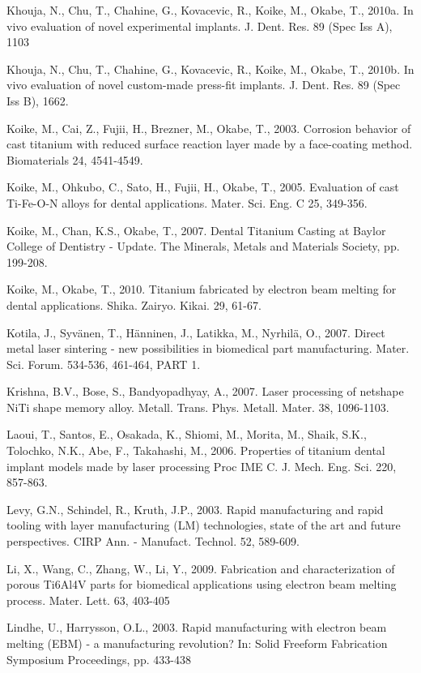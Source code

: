 \documentclass[10pt]{article}
\begin{document}
Khouja, N., Chu, T., Chahine, G., Kovacevic, R., Koike, M., Okabe, T., 2010a. In vivo evaluation of novel experimental implants. J. Dent. Res. 89 (Spec Iss A), 1103

Khouja, N., Chu, T., Chahine, G., Kovacevic, R., Koike, M., Okabe, T., 2010b. In vivo evaluation of novel custom-made press-fit implants. J. Dent. Res. 89 (Spec Iss B), 1662.

Koike, M., Cai, Z., Fujii, H., Brezner, M., Okabe, T., 2003. Corrosion behavior of cast titanium with reduced surface reaction layer made by a face-coating method. Biomaterials 24, 4541-4549.

Koike, M., Ohkubo, C., Sato, H., Fujii, H., Okabe, T., 2005. Evaluation of cast Ti-Fe-O-N alloys for dental applications. Mater. Sci. Eng. C 25, 349-356.

Koike, M., Chan, K.S., Okabe, T., 2007. Dental Titanium Casting at Baylor College of Dentistry - Update. The Minerals, Metals and Materials Society, pp. 199-208.

Koike, M., Okabe, T., 2010. Titanium fabricated by electron beam melting for dental applications. Shika. Zairyo. Kikai. 29, 61-67.

Kotila, J., Syvänen, T., Hänninen, J., Latikka, M., Nyrhilä, O., 2007. Direct metal laser sintering - new possibilities in biomedical part manufacturing. Mater. Sci. Forum. 534-536, 461-464, PART 1.

Krishna, B.V., Bose, S., Bandyopadhyay, A., 2007. Laser processing of netshape NiTi shape memory alloy. Metall. Trans. Phys. Metall. Mater. 38, 1096-1103.

Laoui, T., Santos, E., Osakada, K., Shiomi, M., Morita, M., Shaik, S.K., Tolochko, N.K., Abe, F., Takahashi, M., 2006. Properties of titanium dental implant models made by laser processing Proc IME C. J. Mech. Eng. Sci. 220, 857-863.

Levy, G.N., Schindel, R., Kruth, J.P., 2003. Rapid manufacturing and rapid tooling with layer manufacturing (LM) technologies, state of the art and future perspectives. CIRP Ann. - Manufact. Technol. 52, 589-609.

Li, X., Wang, C., Zhang, W., Li, Y., 2009. Fabrication and characterization of porous Ti6Al4V parts for biomedical applications using electron beam melting process. Mater. Lett. 63, 403-405

Lindhe, U., Harrysson, O.L., 2003. Rapid manufacturing with electron beam melting (EBM) - a manufacturing revolution? In: Solid Freeform Fabrication Symposium Proceedings, pp. 433-438
\end{document}
